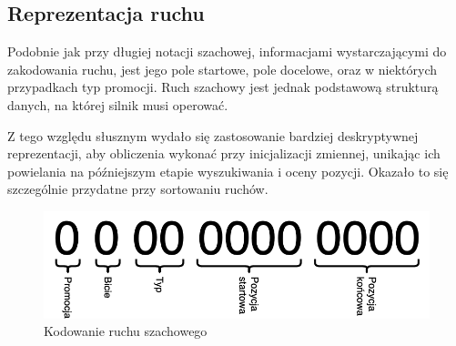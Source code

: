 \subsection{Reprezentacja ruchu}
\label{subsec:reprezentacja-ruchu}

Podobnie jak przy długiej notacji szachowej, informacjami wystarczającymi do zakodowania ruchu, jest jego pole startowe, pole docelowe, oraz w niektórych przypadkach typ promocji.
Ruch szachowy jest jednak podstawową strukturą danych, na której silnik musi operować.

Z tego względu słusznym wydało się zastosowanie bardziej deskryptywnej reprezentacji, aby obliczenia wykonać przy inicjalizacji zmiennej, unikając ich powielania na późniejszym etapie wyszukiwania i oceny pozycji.
Okazało to się szczególnie przydatne przy sortowaniu ruchów.

\begin{figure}[ht]
    \centering
    \includegraphics[width=0.85\linewidth]{rozdzialy/rozdzial01/2_reprezentacja-pozycji/rysunki/kodowanie_ruchu}
    \caption{Kodowanie ruchu szachowego}
    \label{fig:kodowanie-ruchu}
\end{figure}
